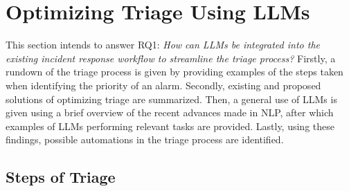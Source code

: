 \section{Optimizing Triage Using LLMs}
\label{sec:rq1}

This section intends to answer RQ1:
\textit{How can LLMs be integrated into the existing incident response workflow to streamline the triage process?}
Firstly, a rundown of the triage process is given by providing examples of the steps taken when identifying the priority
of an alarm.
Secondly, existing and proposed solutions of optimizing triage are summarized.
Then, a general use of LLMs is given using a brief overview of the recent advances made in NLP, after which examples
of LLMs performing relevant tasks are provided.
Lastly, using these findings, possible automations in the triage process are identified.

\subsection{Steps of Triage}
\label{subsec:rq1-steps-of-triage}

